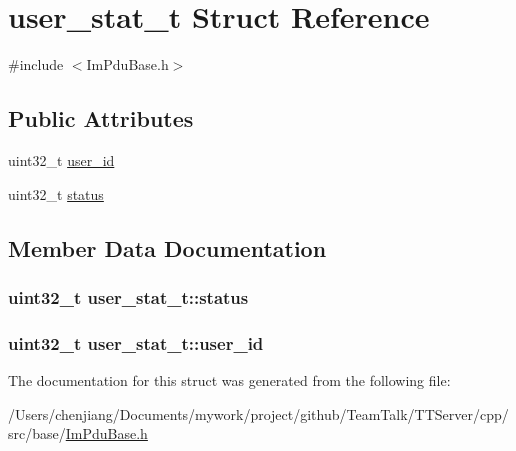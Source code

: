\hypertarget{structuser__stat__t}{}\section{user\+\_\+stat\+\_\+t Struct Reference}
\label{structuser__stat__t}


{\ttfamily \#include $<$Im\+Pdu\+Base.\+h$>$}

\subsection*{Public Attributes}
\begin{DoxyCompactItemize}
\item 
uint32\+\_\+t \hyperlink{structuser__stat__t_a6839aeb7ebf73525ffdabd626a0f6efc}{user\+\_\+id}
\item 
uint32\+\_\+t \hyperlink{structuser__stat__t_a331c1d86f2016a40c0e891bb3b9b9291}{status}
\end{DoxyCompactItemize}


\subsection{Member Data Documentation}
\hypertarget{structuser__stat__t_a331c1d86f2016a40c0e891bb3b9b9291}{}
\subsubsection[{status}]{\setlength{\rightskip}{0pt plus 5cm}uint32\+\_\+t user\+\_\+stat\+\_\+t\+::status}\label{structuser__stat__t_a331c1d86f2016a40c0e891bb3b9b9291}
\hypertarget{structuser__stat__t_a6839aeb7ebf73525ffdabd626a0f6efc}{}
\subsubsection[{user\+\_\+id}]{\setlength{\rightskip}{0pt plus 5cm}uint32\+\_\+t user\+\_\+stat\+\_\+t\+::user\+\_\+id}\label{structuser__stat__t_a6839aeb7ebf73525ffdabd626a0f6efc}


The documentation for this struct was generated from the following file\+:\begin{DoxyCompactItemize}
\item 
/\+Users/chenjiang/\+Documents/mywork/project/github/\+Team\+Talk/\+T\+T\+Server/cpp/src/base/\hyperlink{_im_pdu_base_8h}{Im\+Pdu\+Base.\+h}\end{DoxyCompactItemize}
